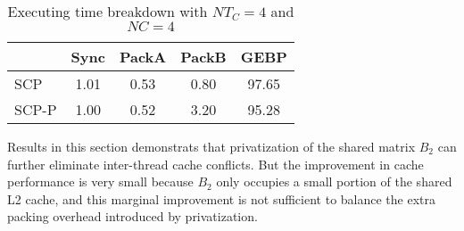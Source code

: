 \begin{table}
  \centering
  \caption{Executing time breakdown with $NT_C=4$ and $NC=4$}
  \label{tab:breakdown}
  \setlength{\tabcolsep}{3.5pt}
  \begin{tabular}{lcccc}
    \toprule
     & Sync & PackA & PackB & GEBP\\
    \midrule
    SCP   & 1.01 & 0.53 & 0.80 & 97.65 \\
    SCP-P & 1.00 & 0.52 & 3.20 & 95.28\\
    \bottomrule
  \end{tabular}
\end{table}

Results in this section demonstrats that
privatization of the shared matrix $B_2$ can further
eliminate inter-thread cache conflicts.
But the improvement in cache performance is very small because
$B_2$ only occupies a small portion of the shared L2 cache,
and this marginal improvement is not sufficient to
balance the extra packing overhead introduced
by privatization.
